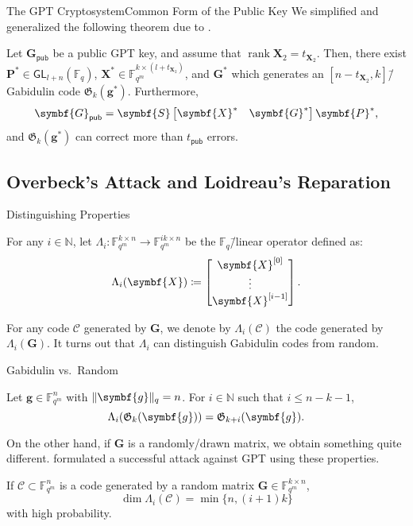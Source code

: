 \documentclass[usepdftitle=false]{beamer}
\renewcommand*{\vec}{\symbf}
\newcommand*{\mat}{\symbf}
\DeclareMathOperator{\rank}{rank}
\newcommand*{\GL}{\ensuremath{\mathsf{GL}}}
\newcommand*{\pub}{\ensuremath{\mathsf{pub}}}
\newcommand*{\FF}{\ensuremath{\mathbb{F}}}
\newcommand*{\NN}{\ensuremath{\mathbb{N}}}
\newcommand*{\Gab}{\ensuremath{\mathfrak{G}}}
\DeclarePairedDelimiter{\norm}{\lVert}{\rVert}
\newcommand*{\normR}[2]{\ensuremath{\norm{#1}_{#2}}}
\begin{document}
\begin{frame}{The GPT Cryptosystem}{Common Form of the Public Key}
  We simplified and generalized the following theorem due to
  \textcite{Ksh07}.
  \begin{theorem}
    Let \(\mat{G}_{\pub}\) be a public GPT key, and assume that
    \(\rank\mat{X}_2 = t_{\mat{X}_2}\).  Then, there exist
    \(\mat{P}^* \in \GL_{l + n}(\FF_q)\),
    \(\mat{X}^* \in \FF_{q^m}^{k \times (l + t_{\mat{X}_2})}\), and
    \(\mat{G}^*\) which generates an
    \([n - t_{\mat{X}_2}, k]\)\=/Gabidulin code \(\Gab_k(\vec{g}^*)\).
    Furthermore,
    \[
      \mat{G}_{\pub} =
      \mat{S}
      \begin{bmatrix} \mat{X}^* & \mat{G}^* \end{bmatrix}
      \mat{P}^*\text,
    \]
    and \(\Gab_k(\vec{g}^*)\) can correct more than \(t_{\pub}\) errors.
  \end{theorem}
\end{frame}

\subsection{Overbeck's Attack and Loidreau's Reparation}

\begin{frame}{Distinguishing Properties}
  \begin{definition}
    For any \(i \in \NN\), let
    \(\Lambda_i\colon \FF_{q^m}^{k \times n} \to \FF_{q^m}^{i k \times
      n}\) be the \(\FF_q\)\=/linear operator defined as:
    \[
      \Lambda_i(\mat{X}) \coloneqq
      \begin{bmatrix}
        \mat{X}^{[0]} \\
        \vdots \\ \mat{X}^{[i - 1]}
      \end{bmatrix}\text.
    \]
  \end{definition}
  For any code \(\mathcal{C}\) generated by \(\mat{G}\), we denote by
  \(\Lambda_i(\mathcal{C})\) the code generated by
  \(\Lambda_i(\mat{G})\).  \alert{It turns out that \(\Lambda_i\) can
    distinguish Gabidulin codes from random}.
\end{frame}

\begin{frame}{Gabidulin vs.\ Random}
  \begin{lemma}
    Let \(\vec{g} \in \FF_{q^m}^n\) with \(\normR{\vec{g}}{q} = n\).
    For \(i \in \NN\) such that \(i \le n - k - 1\),
    \[
      \Lambda_i(\Gab_k(\vec{g})) = \Gab_{k + i}(\vec{g})\text.
    \]
  \end{lemma}
  On the other hand, if \(\mat{G}\) is a randomly\-/drawn matrix, we
  obtain something quite different.  \Textcite{Ove05, Ove06, Ove08}
  formulated a successful attack against GPT using these properties.
  \begin{lemma}
    If \(\mathcal{C} \subset \FF_{q^m}^n\) is a code generated by a
    random matrix \(\mat{G} \in \FF_{q^m}^{k \times n}\),
    \[
      \dim\Lambda_i(\mathcal{C}) = \min\{n, (i + 1) k\}
    \]
    with high probability.
  \end{lemma}
\end{frame}
\end{document}
